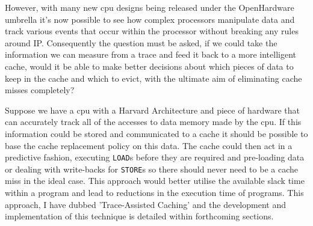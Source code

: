 However, with many new \gls{cpu} designs being released under the OpenHardware \cite{OpenSourceHardware} umbrella it's now possible to see how complex processors manipulate data and track various events that occur within the processor without breaking any rules around IP. Consequently the question must be asked, if we could take the information we can measure from a trace and feed it back to a more intelligent cache, would it be able to make better decisions about which pieces of data to keep in the cache and which to evict, with the ultimate aim of eliminating cache misses completely?

Suppose we have a \gls{cpu} with a Harvard Architecture and piece of hardware that can accurately track all of the accesses to data memory made by the \gls{cpu}. If this information could be stored and communicated to a cache it should be possible to base the cache replacement policy on this data. The cache could then act in a predictive fashion, executing \texttt{LOAD}s before they are required and pre-loading data or dealing with write-backs for \texttt{STORE}s so there should never need to be a cache miss in the ideal case. This approach would better utilise the available slack time within a program and lead to reductions in the execution time of programs. This approach, I have dubbed 'Trace-Assisted Caching' and the development and implementation of this technique is detailed within forthcoming sections.


